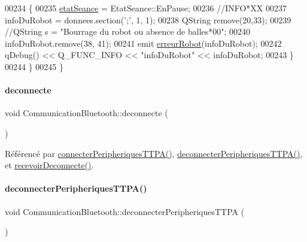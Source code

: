 \begin{DoxyCode}
00234         \{
00235             \hyperlink{class_communication_bluetooth_adc66f3034d46f3964a26b62ad98e784f}{etatSeance} = EtatSeance::EnPause;
00236             \textcolor{comment}{//INFO*XX}
00237             infoDuRobot = donnees.section(\textcolor{charliteral}{';'}, 1, 1);
00238             QString \textcolor{keyword}{remove}(20,33);
00239             \textcolor{comment}{//QString s = "Bourrage du robot ou absence de balles*00";}
00240             infoDuRobot.remove(38, 41);
00241             emit \hyperlink{class_communication_bluetooth_a74bc2dc753fa3490a2847f3c9497e147}{erreurRobot}(infoDuRobot);
00242             qDebug() << Q\_FUNC\_INFO << \textcolor{stringliteral}{"infoDuRobot"} << infoDuRobot;
00243         \}
00244     \}
00245 \}
\end{DoxyCode}
\mbox{\label{class_communication_bluetooth_abab4c8889f42c8b818895af96863480e}} 
\paragraph{\texorpdfstring{deconnecte}{deconnecte}}
{\footnotesize\ttfamily void Communication\+Bluetooth\+::deconnecte (\begin{DoxyParamCaption}{ }\end{DoxyParamCaption})\hspace{0.3cm}{\ttfamily [signal]}}



Référencé par \hyperlink{class_communication_bluetooth_a321073d9dc26aad4b34ecf41a1dee8a4}{connecter\+Peripheriques\+T\+T\+P\+A()}, \hyperlink{class_communication_bluetooth_aacfffa47d72f3ab5ab554001d5f38fd1}{deconnecter\+Peripheriques\+T\+T\+P\+A()}, et \hyperlink{class_communication_bluetooth_af187cbc294befb656070f9817763104b}{recevoir\+Deconnecte()}.

\mbox{\label{class_communication_bluetooth_aacfffa47d72f3ab5ab554001d5f38fd1}} 
\paragraph{\texorpdfstring{deconnecter\+Peripheriques\+T\+T\+P\+A()}{deconnecterPeripheriquesTTPA()}}
{\footnotesize\ttfamily void Communication\+Bluetooth\+::deconnecter\+Peripheriques\+T\+T\+PA (\begin{DoxyParamCaption}{ }\end{DoxyParamCaption})}



